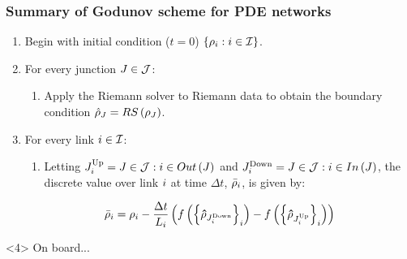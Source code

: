 \begin{frame}
\frametitle{Summary of Godunov scheme for PDE networks}


\begin{enumerate}
\item<1-> Begin with initial condition ($t=0$) $\left\{ \rho_{i}:i\in\mathcal{I}\right\} $.
\item<2-> For every junction $J\in\mathcal{J}$:
\begin{enumerate}
\item<2-> Apply the Riemann solver to Riemann data to obtain the boundary condition
$\hat{\mathbf{\rho}}_{J}=RS\left(\mathbf{\rho}_{J}\right)$.
\end{enumerate}
\item<3-> For every link $i\in\mathcal{I}$:

\begin{enumerate}
\item<3-> Letting $J_{i}^{\text{Up}}=J\in\mathcal{J}:i\in Out\left(J\right)$
and $J_{i}^{\text{Down}}=J\in\mathcal{J}:i\in In\left(J\right)$,
the discrete value over link $i$ at time $\Delta t$, $\bar{\rho}_{i}$,
is given by:
\end{enumerate}

\[
\bar{\rho}_{i}=\rho_{i}-\frac{\Delta t}{L_{i}}\left(f\left(\left\{ \mathbf{\hat{\rho}}_{J_{i}^{\text{Down}}}\right\} _{i}\right)-f\left(\left\{ \mathbf{\hat{\rho}}_{J_{i}^{\text{Up}}}\right\} _{i}\right)\right)
\]

\end{enumerate}

\begin{example}<4>
On board...
\end{example}

\end{frame}


